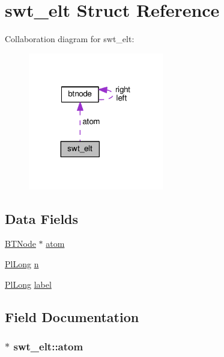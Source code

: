 \hypertarget{structswt__elt}{}\section{swt\+\_\+elt Struct Reference}
\label{structswt__elt}


Collaboration diagram for swt\+\_\+elt\+:\nopagebreak
\begin{figure}[H]
\begin{center}
\leavevmode
\includegraphics[width=167pt]{structswt__elt__coll__graph}
\end{center}
\end{figure}
\subsection*{Data Fields}
\begin{DoxyCompactItemize}
\item 
\hyperlink{bt__string_8h_a94e2311ccccb66fae2c4ce55649526fc}{B\+T\+Node} $\ast$ \hyperlink{structswt__elt_a04d09a38ab072084ef44f3b17a75b25d}{atom}
\item 
\hyperlink{gprolog_8h_a4d005b136d7fb28537eb1815f7868b63}{Pl\+Long} \hyperlink{structswt__elt_aa3fb3cf68a09b57a7abad92d1888d297}{n}
\item 
\hyperlink{gprolog_8h_a4d005b136d7fb28537eb1815f7868b63}{Pl\+Long} \hyperlink{structswt__elt_a979d2691c64643e5d59f471a3e5e40f6}{label}
\end{DoxyCompactItemize}


\subsection{Field Documentation}
\subsubsection[{\texorpdfstring{atom}{atom}}]{$\ast$ swt\+\_\+elt\+::atom}\hypertarget{structswt__elt_a04d09a38ab072084ef44f3b17a75b25d}{}\label{structswt__elt_a04d09a38ab072084ef44f3b17a75b25d}
